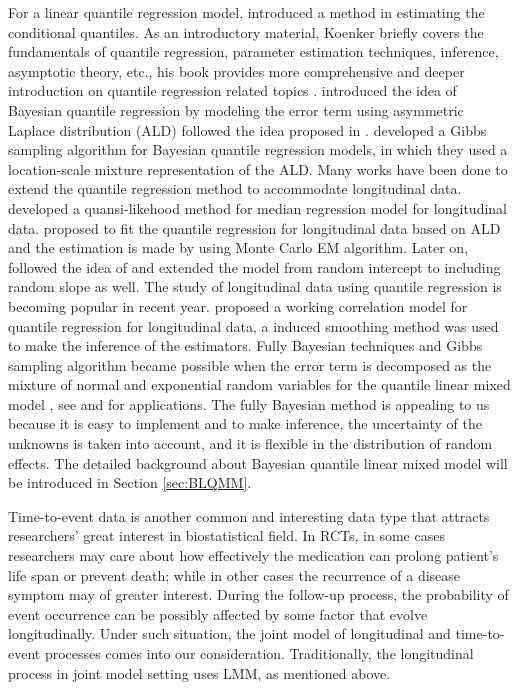 \documentclass{article}
\begin{document}
For a linear quantile regression model, \citep{koenker1978regression} introduced a method in estimating the conditional quantiles. As an introductory material, Koenker \citep{koenker2001quantile} briefly covers the fundamentals of quantile regression, parameter estimation techniques, inference, asymptotic theory, etc., his book provides more comprehensive and deeper introduction on quantile regression related topics \citep{koenker2005quantile}.  \citep{yu2001bayesian} introduced the idea of Bayesian quantile regression by modeling the error term using asymmetric Laplace distribution (ALD) followed the idea proposed in \citep{koenker1978regression}. \citep{kozumi2011gibbs} developed a Gibbs sampling algorithm for Bayesian quantile regression models, in which they used a location-scale mixture representation of the ALD. Many works have been done to extend the quantile regression method to accommodate longitudinal data. \citep{jung1996quasi} developed a quansi-likehood method for median regression model for longitudinal data. \citep{geraci2007quantile} proposed to fit the quantile regression for longitudinal data based on ALD and the estimation is made by using Monte Carlo EM algorithm. Later on, \citep{liu2009mixed} followed the idea of \citep{geraci2007quantile} and extended the model from random intercept to including random slope as well. The study of longitudinal data using quantile regression is becoming popular in recent year. \citep{fu2012quantile} proposed  a working correlation model for quantile regression for longitudinal data, a induced smoothing method was used to make the inference of the estimators. Fully Bayesian techniques and  Gibbs sampling algorithm became possible when the error term is decomposed as the mixture of normal and exponential random variables for the quantile linear mixed model  \citep{kotz2001laplace} , see \citep{luo2012bayesian} and \citep{kozumi2011gibbs} for applications. The fully Bayesian method is appealing to us because it is easy to implement and to make inference, the uncertainty of the unknowns is taken into account, and it is flexible in the distribution of random effects. The detailed background about Bayesian quantile linear mixed model will be introduced in Section \ref{sec:BLQMM}.\par


Time-to-event data is another common and interesting data type that attracts researchers' great interest in biostatistical field. In RCTs, in some cases researchers may care about how effectively the medication can prolong patient's life span or prevent death; while in other cases the recurrence of a disease symptom may of greater interest. During the follow-up process, the probability of event occurrence can be possibly affected by some factor that evolve longitudinally. Under such situation, the joint model of longitudinal and time-to-event processes comes into our consideration. Traditionally, the longitudinal process in joint model setting uses LMM, as mentioned above.
\end{document}
